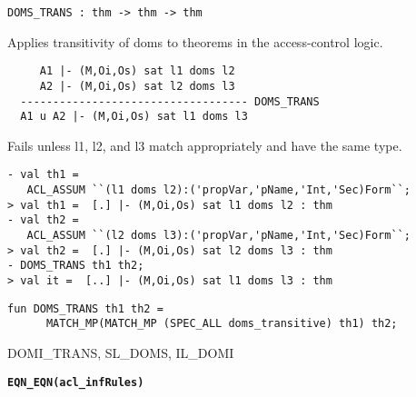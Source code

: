 \begin{verbatim}
DOMS_TRANS : thm -> thm -> thm
\end{verbatim}

\SYNOPSIS
Applies transitivity of doms to theorems in the access-control logic.

\DESCRIBE

\begin{verbatim}
     A1 |- (M,Oi,Os) sat l1 doms l2   
     A2 |- (M,Oi,Os) sat l2 doms l3
  ----------------------------------- DOMS_TRANS
  A1 u A2 |- (M,Oi,Os) sat l1 doms l3
\end{verbatim}

\FAILURE
Fails unless l1, l2, and l3 match appropriately and have the
same type.

\EXAMPLE
\begin{holboxed}
\begin{verbatim}
- val th1 = 
   ACL_ASSUM ``(l1 doms l2):('propVar,'pName,'Int,'Sec)Form``;
> val th1 =  [.] |- (M,Oi,Os) sat l1 doms l2 : thm
- val th2 = 
   ACL_ASSUM ``(l2 doms l3):('propVar,'pName,'Int,'Sec)Form``;
> val th2 =  [.] |- (M,Oi,Os) sat l2 doms l3 : thm
- DOMS_TRANS th1 th2;
> val it =  [..] |- (M,Oi,Os) sat l1 doms l3 : thm
\end{verbatim}
\end{holboxed}


\IMPLEMENTATION
\begin{holboxed}
\begin{verbatim}
fun DOMS_TRANS th1 th2 =
      MATCH_MP(MATCH_MP (SPEC_ALL doms_transitive) th1) th2;
\end{verbatim}
\end{holboxed}

\SEEALSO
DOMI\_TRANS, SL\_DOMS, IL\_DOMI
\ENDDOC

\begin{holboxed}
  \begin{Large}
    \textbf{\texttt{EQN\_EQN}}\hfill{}\textbf{\texttt{(acl\_infRules)}}
  \end{Large}
\end{holboxed}

